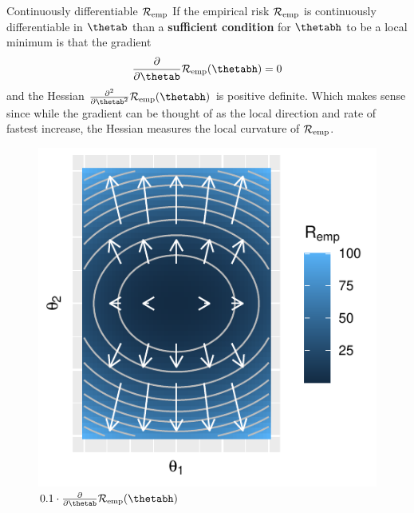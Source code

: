 \documentclass[11pt,compress,t,notes=noshow, xcolor=table]{beamer}
\begin{document}
\begin{vbframe}{Continuously differentiable $\mathcal{R}_{\text{emp}}$}
\footnotesize
If the empirical risk $\mathcal{R}_{\text{emp}}$ is continuously differentiable in $\thetab$ than a \textbf{sufficient condition} for $\thetabh$ to be a local minimum is that the gradient 
\[
\frac{\partial}{\partial\thetab}\riske(\thetabh) = 0
\]
and the Hessian $\frac{\partial^2}{\partial\thetab^2}\riske(\thetabh)$ is positive definite. Which makes sense since while the gradient can be thought of as the local direction and rate of fastest increase, the Hessian measures the local curvature of $\mathcal{R}_{\text{emp}}$.

\begin{figure}[!htb]
  \includegraphics[width=\linewidth]{figure/grad}
  \caption*{\footnotesize$0.1\cdot\frac{\partial}{\partial\thetab}\riske(\thetabh)$}
\endminipage\hfill
{}

\end{figure}
\end{vbframe}
\end{document}
